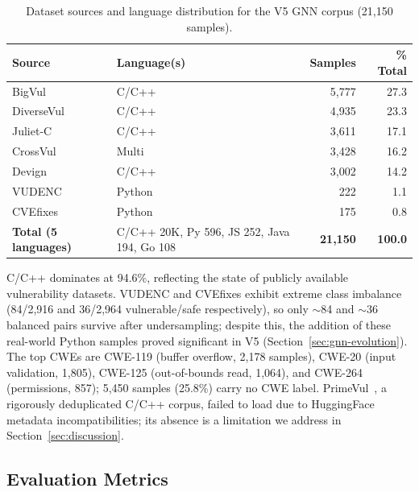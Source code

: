 \begin{table}[H]
\centering
\small
\caption{Dataset sources and language distribution for the V5 GNN corpus (21,150 samples).}
\label{tab:datasets}
\begin{tabular}{@{}llrr@{}}
\toprule
\textbf{Source} & \textbf{Language(s)} & \textbf{Samples} & \textbf{\% Total} \\
\midrule
BigVul~\cite{bigvul2020} & C/C++ & 5,777 & 27.3 \\
DiverseVul~\cite{diversevul2023} & C/C++ & 4,935 & 23.3 \\
Juliet-C~\cite{juliet2017} & C/C++ & 3,611 & 17.1 \\
CrossVul~\cite{crossvul2021} & Multi & 3,428 & 16.2 \\
Devign~\cite{devign2019} & C/C++ & 3,002 & 14.2 \\
VUDENC~\cite{vudenc2021} & Python & 222 & 1.1 \\
CVEfixes~\cite{cvefixes2021} & Python & 175 & 0.8 \\
\midrule
\textbf{Total (5 languages)} & C/C++ 20K, Py 596, JS 252, Java 194, Go 108 & \textbf{21,150} & \textbf{100.0} \\
\bottomrule
\end{tabular}
\end{table}

C/C++ dominates at 94.6\%, reflecting the state of publicly available vulnerability datasets. VUDENC and CVEfixes exhibit extreme class imbalance (84/2,916 and 36/2,964 vulnerable/safe respectively), so only $\sim$84 and $\sim$36 balanced pairs survive after undersampling; despite this, the addition of these real-world Python samples proved significant in V5 (Section~\ref{sec:gnn-evolution}). The top CWEs are CWE-119 (buffer overflow, 2,178 samples), CWE-20 (input validation, 1,805), CWE-125 (out-of-bounds read, 1,064), and CWE-264 (permissions, 857); 5,450 samples (25.8\%) carry no CWE label. PrimeVul~\cite{primevul2024}, a rigorously deduplicated C/C++ corpus, failed to load due to HuggingFace metadata incompatibilities; its absence is a limitation we address in Section~\ref{sec:discussion}.

\subsection{Evaluation Metrics}

